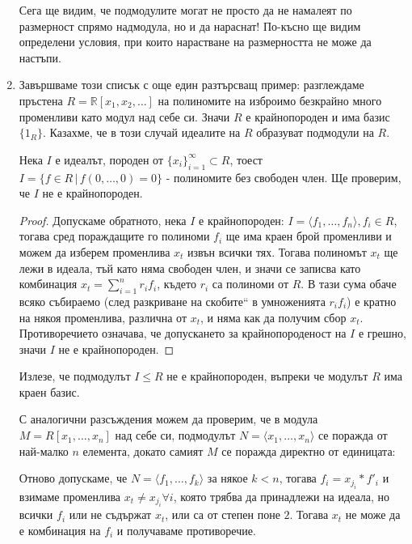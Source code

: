\documentclass{article}
\newif\ifusemulticols
\theoremstyle{definition}
\theoremstyle{remark}
\theoremstyle{plain}
\theoremstyle{plain}
\newenvironment{mymulticols}
    { \ifusemulticols \begin{multicols}{2} \fi }
    { \ifusemulticols \end{multicols} \fi }
\begin{document}
\begin{mymulticols}
\begin{enumerate}
        Сега ще видим, че подмодулите могат не просто да не намалеят по размерност спрямо надмодула,
        но и да нараснат! По-късно ще видим определени условия, при които нарастване на размерността
        не може да настъпи.
    \item Завършваме този списък с още един разтърсващ пример: разглеждаме пръстена $R = \mathbb
        R[x_1, x_2, \dots]$ на полиномите на изброимо безкрайно много променливи като модул над себе
        си.
        Значи $R$ е крайнопороден и има базис $\{ 1_R \}$.
        Казахме, че в този случай идеалите на $R$ образуват подмодули на $R$.

        Нека $I$ е идеалът, породен от $\{x_i\}_{i=1}^\infty\subset R$, тоест $I=\{f\in R \, | \,
        f(0,\ldots,0) = 0\}$ - полиномите без свободен член.
        Ще проверим, че $I$ не е крайнопороден.
        \begin{proof}
            Допускаме обратното, нека $I$ е крайнопороден: $I=\langle
            f_{1},\dots,f_{n}\rangle,f_{i}\in R$, тогава сред пораждащите го полиноми $f_i$ ще има
            краен брой променливи и можем да изберем променлива $x_{t}$ извън всички тях.
            Тогава полиномът $x_{t}$ ще лежи в идеала, тъй като няма свободен член, и значи се
            записва като комбинация $x_{t}=\sum_{i=1}^{n}r_{i}f_{i}$, където $r_{i}$ са полиноми от
            $R$.
            В тази сума обаче всяко събираемо (след \quotedblbase разкриване на скобите`` в
            умноженията $r_{i}f_{i}$) е кратно на някоя променлива, различна от $x_{t}$, и няма как
            да получим сбор $x_{t}$.
            Противоречието означава, че допускането за крайнопороденост на $I$ е грешно, значи $I$
            не е крайнопороден.
        \end{proof}

        Излезе, че подмодулът $I \le R$ не е крайнопороден, въпреки че модулът $R$ има краен базис.

        С аналогични разсъждения можем да проверим, че в модула $M = R[x_1,\dots,x_n]$ над себе си,
        подмодулът $N = \langle x_1,\dots,x_n \rangle$ се поражда от най-малко $n$ елемента, докато
        самият $M$ се поражда директно от единицата:

         Отново допускаме, че $N = \langle f_1, \dots, f_k \rangle$ за някое $k < n$, тогава $f_i =
         x_{j_i}*f'_i$ и взимаме променлива $x_t \not= x_{j_i} \forall i$, която трябва да
         принадлежи на идеала, но всички $f_i$ или не съдържат $x_t$, или са от степен поне $2$.
         Тогава $x_t$ не може да е комбинация на $f_i$ и получаваме противоречие.


\end{enumerate}
\end{mymulticols}
\end{document}
